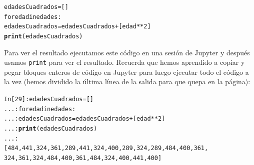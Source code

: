 \documentclass[10pt,a4paper]{article}\usepackage[]{graphicx}\usepackage[]{color}
\makeatletter
\newcommand{\hlkwd}[1]{\textcolor[rgb]{0.737,0.353,0.396}{\textbf{#1}}}%
\newenvironment{kframe}{%
 \def\at@end@of@kframe{}%
 \ifinner\ifhmode%
  \def\at@end@of@kframe{\end{minipage}}%
  \begin{minipage}{\columnwidth}%
 \fi\fi%
 \def\FrameCommand##1{\hskip\@totalleftmargin \hskip-\fboxsep
 \colorbox{shadecolor}{##1}\hskip-\fboxsep
     \hskip-\linewidth \hskip-\@totalleftmargin \hskip\columnwidth}%
 \MakeFramed {\advance\hsize-\width
   \@totalleftmargin\z@ \linewidth\hsize
   \@setminipage}}%
 {\par\unskip\endMakeFramed%
 \at@end@of@kframe}
\newenvironment{knitrout}{}{} %
\makeatother
\begin{document}
\begin{knitrout}
\color{fgcolor}\begin{kframe}
\begin{alltt}
edadesCuadrados = []
for edad in edades:
  edadesCuadrados = edadesCuadrados + [edad**2]
\hlkwd{print}(edadesCuadrados)
\end{alltt}
\end{kframe}
\end{knitrout}
Para ver el resultado ejecutamos este código en una sesión de Jupyter y después usamos {\tt print} para ver el resultado. Recuerda que hemos aprendido a copiar y pegar bloques enteros de código en Jupyter para luego ejecutar todo el código a la vez (hemos dividido la última línea de la salida para que quepa en la página):
\begin{knitrout}
\color{fgcolor}\begin{kframe}
\begin{alltt}
In [29]: edadesCuadrados = []
    ...: for edad in edades:
    ...:   edadesCuadrados = edadesCuadrados + [edad**2]
    ...: \hlkwd{print}(edadesCuadrados)
    ...:
[484, 441, 324, 361, 289, 441, 324, 400, 289, 324, 289, 484, 400, 361,
 324, 361, 324, 484, 400, 361, 484, 324, 400, 441, 400]
\end{alltt}
\end{kframe}
\end{knitrout}
\end{document}
